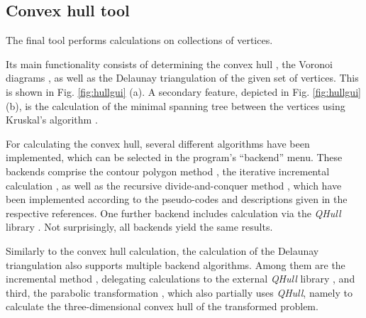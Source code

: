 \subsection{Convex hull tool}
\label{sec:tests_hull}
The final tool performs calculations on collections of vertices.

Its main functionality consists of determining the convex hull \cite[Ch. 11, pp. 243-258]{Berg2008}, 
the Voronoi diagrams \cite[Ch. 7, pp. 147-171]{Berg2008}, 
as well as the Delaunay triangulation \cite[Ch. 9, pp. 191-218]{Berg2008} 
of the given set of vertices. This is shown in Fig. \ref{fig:hullgui} (a).
A secondary feature, depicted in Fig. \ref{fig:hullgui} (b), is the calculation of 
the minimal spanning tree between the vertices using Kruskal's algorithm \cite[pp. 265-268]{Erickson2019}.

For calculating the convex hull, several different algorithms have been implemented,
which can be selected in the program's ``backend'' menu.
These backends comprise the contour polygon method \cite[Ch. 3.1.5, pp. 125-128]{FUH_geo2020},
the iterative incremental calculation \cite[Ch. 3.1.3, pp. 117-123]{FUH_geo2020}, as well as the 
recursive divide-and-conquer method \cite[Ch. 3.1.4, pp. 123-125]{FUH_geo2020}, 
which have been implemented according to the pseudo-codes and descriptions given
in the respective references.
One further backend includes calculation via the \textit{QHull} library \cite{web_qhull}.
Not surprisingly, all backends yield the same results.

Similarly to the convex hull calculation, the calculation of the Delaunay triangulation
also supports multiple backend algorithms.
Among them are the incremental method \cite[Ch. 6.2, pp. 269-282]{FUH_geo2020}, 
delegating calculations to the external \textit{QHull} library \cite{web_qhull}, 
and third, the parabolic transformation \cite[Ch. 6.5, pp. 298-300]{FUH_geo2020}, 
which also partially uses \textit{QHull}, namely to calculate the three-dimensional 
convex hull of the transformed problem.

